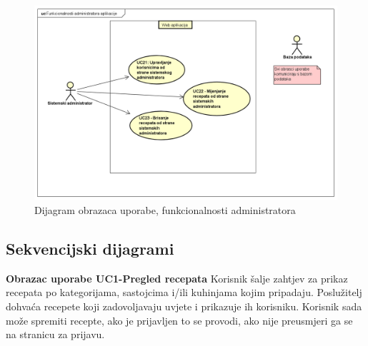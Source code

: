 				\begin{figure}[H]
					\includegraphics[scale= 0.42]{slike/UseCase Diagram4.png}
					\centering
					\caption{Dijagram obrazaca uporabe, funkcionalnosti administratora}
					\label{fig:Dijagram obrazaca uporabe, funkcionalnosti administratora}
				\end{figure}
				
				\eject		
				
				\subsection{Sekvencijski dijagrami}
				
				\noindent
				\textbf{Obrazac uporabe UC1-Pregled recepata}\newline
				{Korisnik šalje zahtjev za prikaz recepata po kategorijama, sastojcima i/ili kuhinjama kojim pripadaju. Poslužitelj dohvaća recepete koji zadovoljavaju uvjete i prikazuje ih korisniku. Korisnik sada može spremiti recepte, ako je prijavljen to se provodi, ako nije preusmjeri ga se na stranicu za prijavu.}
				
